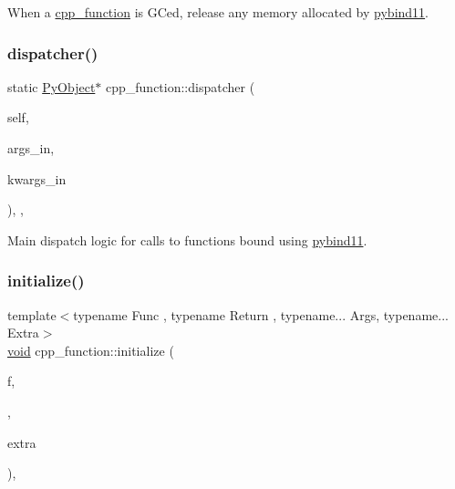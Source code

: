 When a \mbox{\hyperlink{classcpp__function}{cpp\+\_\+function}} is G\+Ced, release any memory allocated by \mbox{\hyperlink{namespacepybind11}{pybind11}}. 

\mbox{\label{classcpp__function_ab1792b64255d0159f38853a6d8f508bb}} 
\subsubsection{\texorpdfstring{dispatcher()}{dispatcher()}}
{\footnotesize\ttfamily static \mbox{\hyperlink{_python27_2object_8h_aadc84ac7aed2cfa6f20c25f62bf3dac7}{Py\+Object}}$\ast$ cpp\+\_\+function\+::dispatcher (\begin{DoxyParamCaption}\item[{\mbox{\hyperlink{_python27_2object_8h_aadc84ac7aed2cfa6f20c25f62bf3dac7}{Py\+Object}} $\ast$}]{self,  }\item[{\mbox{\hyperlink{_python27_2object_8h_aadc84ac7aed2cfa6f20c25f62bf3dac7}{Py\+Object}} $\ast$}]{args\+\_\+in,  }\item[{\mbox{\hyperlink{_python27_2object_8h_aadc84ac7aed2cfa6f20c25f62bf3dac7}{Py\+Object}} $\ast$}]{kwargs\+\_\+in }\end{DoxyParamCaption})\hspace{0.3cm}{\ttfamily [inline]}, {\ttfamily [static]}, {\ttfamily [protected]}}



Main dispatch logic for calls to functions bound using \mbox{\hyperlink{namespacepybind11}{pybind11}}. 

\mbox{\label{classcpp__function_a97487e306e9e0a8d0535fb5fe5c6d8ef}} 
\subsubsection{\texorpdfstring{initialize()}{initialize()}}
{\footnotesize\ttfamily template$<$typename Func , typename Return , typename... Args, typename... Extra$>$ \\
\mbox{\hyperlink{_s_d_l__opengles2__gl2ext_8h_ae5d8fa23ad07c48bb609509eae494c95}{void}} cpp\+\_\+function\+::initialize (\begin{DoxyParamCaption}\item[{Func \&\&}]{f,  }\item[{\mbox{\hyperlink{_python-ast_8h_abdae7f49d66ce8e500825bb53aa14901}{Return}}($\ast$)(Args...)}]{,  }\item[{const Extra \&...}]{extra }\end{DoxyParamCaption})\hspace{0.3cm}{\ttfamily [inline]}, {\ttfamily [protected]}}



